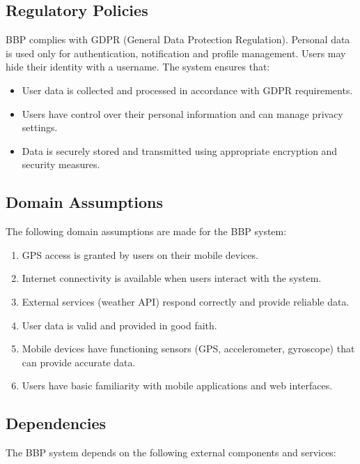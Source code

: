 \subsection{Regulatory Policies}
\label{subsec:regulatory_policies}%

BBP complies with GDPR (General Data Protection Regulation). Personal data is used only for authentication, notification and profile management. Users may hide their identity with a username. The system ensures that:
\begin{itemize}
    \item User data is collected and processed in accordance with GDPR requirements.
    \item Users have control over their personal information and can manage privacy settings.
    \item Data is securely stored and transmitted using appropriate encryption and security measures.
\end{itemize}

\subsection{Domain Assumptions}
\label{subsec:domain_assumptions}%

The following domain assumptions are made for the BBP system:

\begin{enumerate}
    \item GPS access is granted by users on their mobile devices.
    \item Internet connectivity is available when users interact with the system.
    \item External services (weather API) respond correctly and provide reliable data.
    \item User data is valid and provided in good faith.
    \item Mobile devices have functioning sensors (GPS, accelerometer, gyroscope) that can provide accurate data.
    \item Users have basic familiarity with mobile applications and web interfaces.
\end{enumerate}

\subsection{Dependencies}
\label{subsec:dependencies}%

The BBP system depends on the following external components and services:

